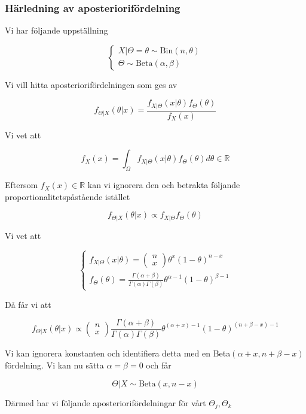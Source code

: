 \documentclass{article}
\begin{document}
\subsubsection{Härledning av aposteriorifördelning}

Vi har följande uppställning

\[
\begin{cases}
    X|\Theta=\theta\sim \text{Bin}(n,\theta)\\
    \Theta\sim \text{Beta}(\alpha,\beta)
\end{cases}
\]

Vi vill hitta aposteriorifördelningen som ges av

\[
f_{\Theta|X}(\theta|x)=\frac{f_{X|\Theta}(x|\theta)f_\Theta(\theta)}{f_X(x)}
\]

Vi vet att 

\[
f_X(x)=\int_\mathbb{\Omega}f_{X|\Theta}(x|\theta)f_{\Theta}(\theta)d\theta \in \mathbb{R}
\]

Eftersom $f_X(x)\in \mathbb{R}$ kan vi ignorera den och betrakta följande proportionalitetspåstående istället

\[
f_{\Theta|X}(\theta|x)\propto f_{X|\Theta}f_{\Theta}(\theta)
\]

Vi vet att 

\[
\begin{cases}
    f_{X|\Theta}(x|\theta)=\begin{pmatrix}
        n\\x
    \end{pmatrix}\theta^x(1-\theta)^{n-x}\\
    f_{\Theta}(\theta)=\frac{\Gamma(\alpha+\beta)}{\Gamma(\alpha)\Gamma(\beta)}\theta^{\alpha-1}(1-\theta)^{\beta-1}
\end{cases}
\]

Då får vi att

\[
f_{\Theta|X}(\theta|x)\propto \begin{pmatrix}
    n\\x    
\end{pmatrix} \frac{\Gamma(\alpha+\beta)}{\Gamma(\alpha)\Gamma(\beta)}\theta^{(\alpha+x)-1  }(1-\theta)^{(n+\beta-x)-1}
\]

Vi kan ignorera konstanten och identifiera detta med en Beta$(\alpha+x,n+\beta-x)$ fördelning. Vi kan nu sätta $\alpha=\beta=0$ och får

\[
\Theta|X\sim \text{Beta}(x,n-x)
\]

Därmed har vi följande aposteriorifördelningar för vårt $\Theta_j,\Theta_k$
\end{document}
